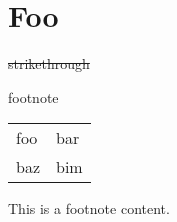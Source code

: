 \section{Foo}

\sout{strikethrough}

footnote

\begin{table}
\begin{tabular}{ll}
foo & bar \\
baz & bim \\
\end{tabular}
\end{table}
This is a footnote content.
